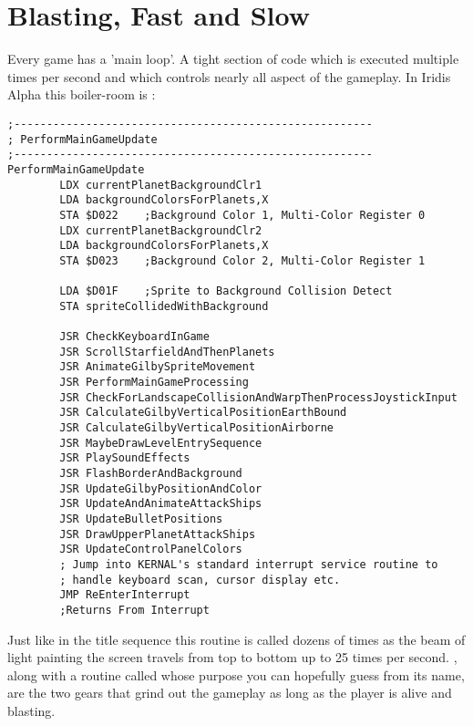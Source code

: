 \chapter{Blasting, Fast and Slow} 
\label{sec:blast}
\lstset{style=6502Style}

Every game has a 'main loop'. A tight section of code which is executed multiple times
per second and which controls nearly all aspect of the gameplay. In Iridis Alpha this
boiler-room is :

\begin{lstlisting}[caption=\icode{PerformMainGameUpdate}\, the spaghetti junction handling nearly everything
during main gameplay.]
;-------------------------------------------------------
; PerformMainGameUpdate
;-------------------------------------------------------
PerformMainGameUpdate
        LDX currentPlanetBackgroundClr1
        LDA backgroundColorsForPlanets,X
        STA $D022    ;Background Color 1, Multi-Color Register 0
        LDX currentPlanetBackgroundClr2
        LDA backgroundColorsForPlanets,X
        STA $D023    ;Background Color 2, Multi-Color Register 1

        LDA $D01F    ;Sprite to Background Collision Detect
        STA spriteCollidedWithBackground

        JSR CheckKeyboardInGame
        JSR ScrollStarfieldAndThenPlanets
        JSR AnimateGilbySpriteMovement
        JSR PerformMainGameProcessing
        JSR CheckForLandscapeCollisionAndWarpThenProcessJoystickInput
        JSR CalculateGilbyVerticalPositionEarthBound
        JSR CalculateGilbyVerticalPositionAirborne
        JSR MaybeDrawLevelEntrySequence
        JSR PlaySoundEffects
        JSR FlashBorderAndBackground
        JSR UpdateGilbyPositionAndColor
        JSR UpdateAndAnimateAttackShips
        JSR UpdateBulletPositions
        JSR DrawUpperPlanetAttackShips
        JSR UpdateControlPanelColors
        ; Jump into KERNAL's standard interrupt service routine to 
        ; handle keyboard scan, cursor display etc.
        JMP ReEnterInterrupt 
        ;Returns From Interrupt
\end{lstlisting}

Just like in the title sequence this routine is called dozens of times as the 
beam of light painting the screen travels from top to bottom up to 25 times per second.
, along with a routine called 
whose purpose you can hopefully guess from its name, are the two gears that grind out the
gameplay as long as the player is alive and blasting. 

